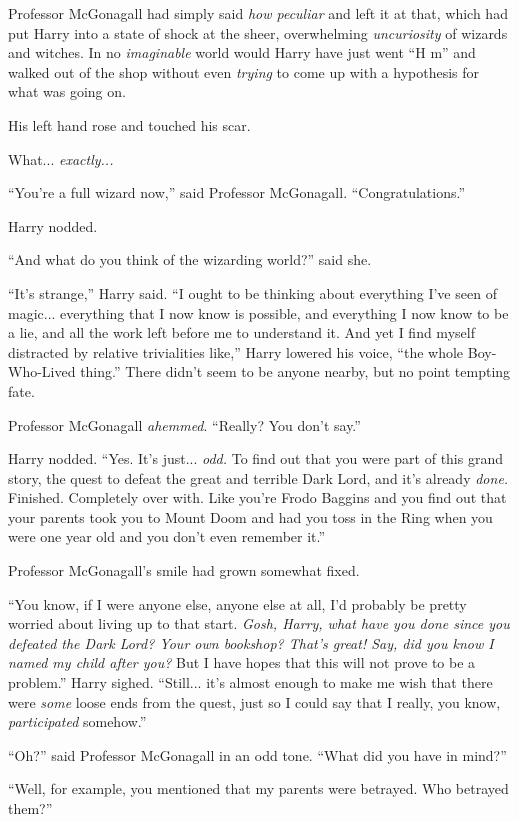 Professor McGonagall had simply said \emph{how peculiar} and left it at that, which had put Harry into a state of shock at the sheer, overwhelming \emph{uncuriosity} of wizards and witches. In no \emph{imaginable} world would Harry have just went ``H m'' and walked out of the shop without even \emph{trying} to come up with a hypothesis for what was going on.

His left hand rose and touched his scar.

What... \emph{exactly...}

``You're a full wizard now,'' said Professor McGonagall. ``Congratulations.''

Harry nodded.

``And what do you think of the wizarding world?'' said she.

``It's strange,'' Harry said. ``I ought to be thinking about everything I've seen of magic... everything that I now know is possible, and everything I now know to be a lie, and all the work left before me to understand it. And yet I find myself distracted by relative trivialities like,'' Harry lowered his voice, ``the whole Boy-Who-Lived thing.'' There didn't seem to be anyone nearby, but no point tempting fate.

Professor McGonagall \emph{ahemmed}. ``Really? You don't say.''

Harry nodded. ``Yes. It's just... \emph{odd.} To find out that you were part of this grand story, the quest to defeat the great and terrible Dark Lord, and it's already \emph{done.} Finished. Completely over with. Like you're Frodo Baggins and you find out that your parents took you to Mount Doom and had you toss in the Ring when you were one year old and you don't even remember it.''

Professor McGonagall's smile had grown somewhat fixed.

``You know, if I were anyone else, anyone else at all, I'd probably be pretty worried about living up to that start. \emph{Gosh, Harry, what have you done since you defeated the Dark Lord? Your own bookshop? That's great! Say, did you know I named my child after you?} But I have hopes that this will not prove to be a problem.'' Harry sighed. ``Still... it's almost enough to make me wish that there were \emph{some} loose ends from the quest, just so I could say that I really, you know, \emph{participated} somehow.''

``Oh?'' said Professor McGonagall in an odd tone. ``What did you have in mind?''

``Well, for example, you mentioned that my parents were betrayed. Who betrayed them?''

